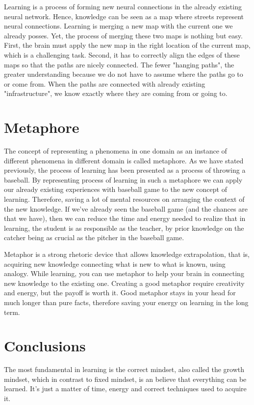 \documentclass{article}
\begin{document}
Learning is a process of forming new neural connections in the already existing neural network. Hence, knowledge can be seen as a map where streets represent neural connections. Learning is merging a new map with the current one we already posses. Yet, the process of merging these two maps is nothing but easy. First, the brain must apply the new map in the right location of the current map, which is a challenging task. Second, it has to correctly align the edges of these maps so that the paths are nicely connected. The fewer "hanging paths", the greater understanding because we do not have to assume where the paths go to or come from. When the paths are connected with already existing "infrastructure", we know exactly where they are coming from or going to. 


\section{Metaphore}
The concept of representing a phenomena in one domain as an instance of different phenomena in different domain is called metaphore. As we have stated previously, the process of learning has been presented as a process of throwing a baseball. By representing process of learning in such a metaphore we can apply our already existing experiences with baseball game to the new concept of learning. Therefore, saving a lot of mental resources on arranging the context of the new knowledge. If we've already seen the baseball game (and the chances are that we have), then we can reduce the time and energy needed to realize that in learning, the student is as responsible as the teacher, by prior knowledge on the catcher being as crucial as the pitcher in the baseball game.

Metaphor is a strong rhetoric device that allows knowledge extrapolation, that is, acquiring new knowledge  connecting what is new to what is known, using analogy. While learning, you can use metaphor to help your brain in connecting new knowledge to the existing one. Creating a good metaphor require creativity and energy, but the payoff is worth it. Good metaphor stays in your head for much longer than pure facts, therefore saving your energy on learning in the long term. 

\section{Conclusions}

The most fundamental in learning is the correct mindset, also called the growth mindset, which in contrast to fixed mindset, is an believe that everything can be learned. It's just a matter of time, energy and correct techniques used to acquire it. 



\end{document}
